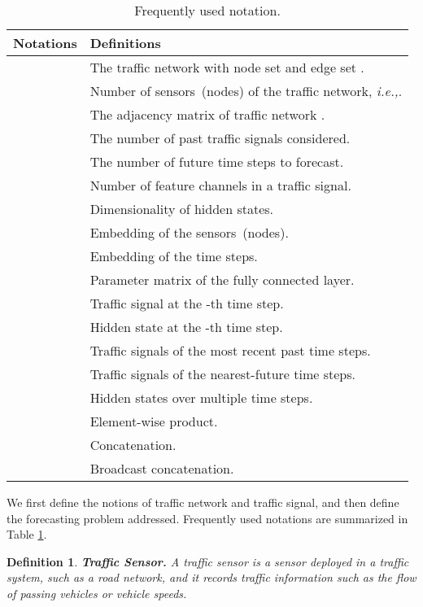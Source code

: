 \documentclass[sigconf, nonacm]{acmart}
\newcommand{\ie}{\textit{i.e.,}\xspace}
\newtheorem{definition}{Definition}
\begin{document}
\begin{table}
\caption{Frequently used notation. }
    \label{tab:notations}
    \begin{tabular}{m{1.3cm}<{\centering}|m{6.3cm}}
      \toprule
      \textbf{Notations} & \textbf{Definitions}\\
       \midrule
 & The traffic network  with node set  and edge set . \\
       & Number of sensors~(nodes) of the traffic network, \ie . \\
       & The adjacency matrix of traffic network . \\
       & The number of past traffic signals considered. \\
       & The number of future time steps to forecast. \\
       &  Number of feature channels in a traffic signal. \\
       & Dimensionality of hidden states.\\
       & Embedding of the sensors~(nodes).\\
       & Embedding of the time steps.\\
       & Parameter matrix of the fully connected layer.\\
       & Traffic signal at the -th time step. \\
       & Hidden state at the -th time step. \\
       & Traffic signals of the  most recent past time steps. \\
       & Traffic signals of the  nearest-future time steps. \\
       & Hidden states over multiple time steps.\\
       & Element-wise product.\\
       & Concatenation.\\
       & Broadcast concatenation.\\
      \bottomrule
    \end{tabular}
  \end{table}
\label{Section3}
We first define the notions of traffic network and traffic signal, and then define the forecasting problem addressed. 
Frequently used notations are summarized in Table \ref{tab:notations}.
\begin{definition}
\textbf{Traffic Sensor.} 
A traffic sensor is a sensor deployed in a traffic system, such as a road network, and it records traffic information such as the flow of passing vehicles or vehicle speeds.
\end{definition}
\end{document}
